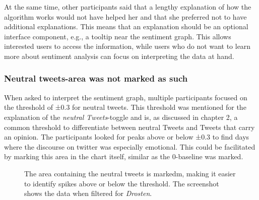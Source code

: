 At the same time, other participants said that a lengthy explanation of how the algorithm works would not have helped her and that she preferred not to have additional explanations. This means that an explanation should be an optional interface component, e.g., a tooltip near the sentiment graph. This allows interested users to access the information, while users who do not want to learn more about sentiment analysis can focus on interpreting the data at hand.

\subsubsection*{Neutral tweets-area was not marked as such}
When asked to interpret the sentiment graph, multiple participants focused on the threshold of ±0.3 for neutral tweets. This threshold was mentioned for the explanation of the \emph{neutral Tweets}-toggle and is, as discussed in chapter 2, a common threshold to differentiate between neutral Tweets and Tweets that carry an opinion. The participants looked for peaks above or below ±0.3 to find days where the discourse on twitter was especially emotional. This could be facilitated by marking this area in the chart itself, similar as the 0-baseline was marked. 

\begin{figure}[htbp]
    \caption{The area containing the neutral tweets is markedm, making it easier to identify spikes above or below the threshold. The screenshot shows the data when filtered for \emph{Drosten}.}
    \label{fig:sentiment_neutral_area}
\end{figure}

